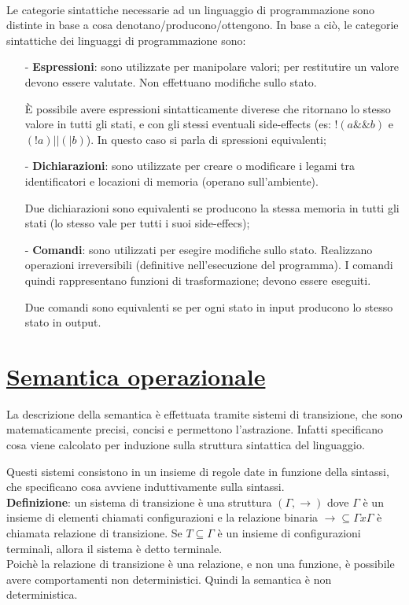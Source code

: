 \documentclass[a4paper, 10pt]{report}
\begin{document}
\noindent \\Le categorie sintattiche necessarie ad un linguaggio di programmazione sono distinte in base a cosa denotano/producono/ottengono. In base a ciò, le categorie sintattiche dei linguaggi di programmazione sono:
\begin{itemize}
\item[-] \textbf{Espressioni}: sono utilizzate per manipolare valori; per restitutire un valore devono essere valutate. Non effettuano modifiche sullo stato.

È possibile avere espressioni sintatticamente diverese che ritornano lo stesso valore in tutti gli stati, e con gli stessi eventuali side-effects (es: $!(a \&\& b)$ e $(!a) || (|b)$). In questo caso si parla di spressioni equivalenti;
\item[-] \textbf{Dichiarazioni}: sono utilizzate per creare o modificare i legami tra identificatori e locazioni di memoria (operano sull'ambiente).

Due dichiarazioni sono equivalenti se producono la stessa memoria in tutti gli stati (lo stesso vale per tutti i suoi side-effecs);
\item[-] \textbf{Comandi}: sono utilizzati per esegire modifiche sullo stato. Realizzano operazioni irreversibili (definitive nell'esecuzione del programma). I comandi quindi rappresentano funzioni di trasformazione; devono essere eseguiti. 

Due comandi sono equivalenti se per ogni stato in input producono lo stesso stato in output.
\end{itemize}

\section*{\underline{Semantica operazionale}}
La descrizione della semantica è effettuata tramite  sistemi di transizione, che sono matematicamente precisi, concisi e permettono l'astrazione. Infatti specificano cosa viene calcolato per induzione sulla struttura sintattica del linguaggio.

Questi sistemi consistono in un insieme di regole date in funzione della sintassi, che specificano cosa avviene  induttivamente sulla sintassi.\\

\noindent \textbf{Definizione}: un sistema di transizione è una struttura $(\Gamma, \rightarrow)$ dove $\Gamma$ è un insieme di elementi chiamati configurazioni e la relazione binaria $\rightarrow \subseteq\Gamma x \Gamma$ è chiamata relazione di transizione. Se $T\subseteq \Gamma$ è un insieme di configurazioni terminali, allora il sistema è detto terminale.\\

\noindent Poichè la relazione di transizione è una relazione, e non una funzione, è possibile avere comportamenti non deterministici. Quindi la semantica è non deterministica.
\end{document}
